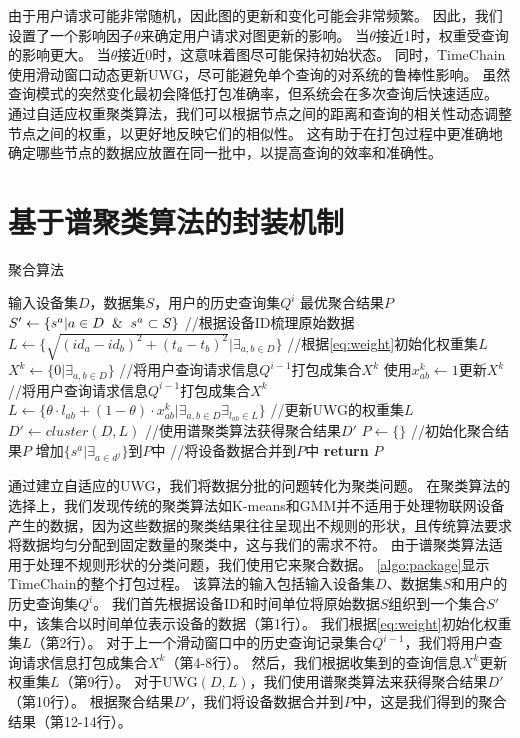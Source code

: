 由于用户请求可能非常随机，因此图的更新和变化可能会非常频繁。
因此，我们设置了一个影响因子$\theta$来确定用户请求对图更新的影响。
当$\theta$接近1时，权重受查询的影响更大。
当$\theta$接近0时，这意味着图尽可能保持初始状态。
同时，TimeChain使用滑动窗口动态更新UWG，尽可能避免单个查询的对系统的鲁棒性影响。
虽然查询模式的突然变化最初会降低打包准确率，但系统会在多次查询后快速适应。
通过自适应权重聚类算法，我们可以根据节点之间的距离和查询的相关性动态调整节点之间的权重，以更好地反映它们的相似性。
这有助于在打包过程中更准确地确定哪些节点的数据应放置在同一批中，以提高查询的效率和准确性。

\section{基于谱聚类算法的封装机制}
\label{sec:ratiocut}

\begin{algorithm}[t]
	\caption{聚合算法}
	\label{algo:package}
    \begin{algorithmic}[1]
        \REQUIRE 输入设备集$D$，数据集$S$，用户的历史查询集$Q^i$
        \ENSURE 最优聚合结果$P$
        \STATE $S' \gets \{s^a | a \in D \And s^a \subset S\}$ //根据设备ID梳理原始数据
        \STATE $L \gets \Big\{ \sqrt{ (id_a - id_b)^2 + (t_a - t_b)^2 } \Big| \exists_{a,b \in D} \Big\}$ //根据\autoref{eq:weight}初始化权重集$L$
        \STATE $X^k \gets \{0 | \exists_{a,b \in D} \}$ //将用户查询请求信息$Q^{i-1}$打包成集合$X^k$
                \STATE \textnormal{使用$x^k_{ab} \gets 1 $更新$X^k$} //将用户查询请求信息$Q^{i-1}$打包成集合$X^k$
            \ENDIF
        \ENDFOR
        \STATE $L \gets \Big\{ \theta \cdot l_{ab} + (1 - \theta) \cdot x_{ab}^k \Big| \exists_{a,b \in D} \exists_{l_{ab} \in L} \Big\}$ //更新UWG的权重集$L$
        \STATE $D' \gets \textit{cluster}(D, L)$ //使用谱聚类算法获得聚合结果$D'$
        \STATE $P \gets \{\}$ //初始化聚合结果$P$
            \STATE \textnormal{增加$\{ s^a | \exists_{a \in d^j} \}$到$P$中} //将设备数据合并到$P$中
        \ENDFOR
        \STATE \textbf{return} $P$
    \end{algorithmic}
\end{algorithm}

通过建立自适应的UWG，我们将数据分批的问题转化为聚类问题。
在聚类算法的选择上，我们发现传统的聚类算法如K-means和GMM并不适用于处理物联网设备产生的数据，因为这些数据的聚类结果往往呈现出不规则的形状，且传统算法要求将数据均匀分配到固定数量的聚类中，这与我们的需求不符。
由于谱聚类算法适用于处理不规则形状的分类问题，我们使用它来聚合数据。
\ref{algo:package}显示TimeChain的整个打包过程。
该算法的输入包括输入设备集$D$、数据集$S$和用户的历史查询集$Q^i$。
我们首先根据设备ID和时间单位将原始数据$S$组织到一个集合$S'$中，该集合以时间单位表示设备的数据（第1行）。
我们根据\autoref{eq:weight}初始化权重集$L$（第2行）。
对于上一个滑动窗口中的历史查询记录集合$Q^{i-1}$，我们将用户查询请求信息打包成集合$X^k$（第4-8行）。
然后，我们根据收集到的查询信息$X^k$更新权重集$L$（第9行）。
对于UWG$(D,L)$，我们使用谱聚类算法来获得聚合结果$D'$（第10行）。
根据聚合结果$D'$，我们将设备数据合并到$P$中，这是我们得到的聚合结果（第12-14行）。

